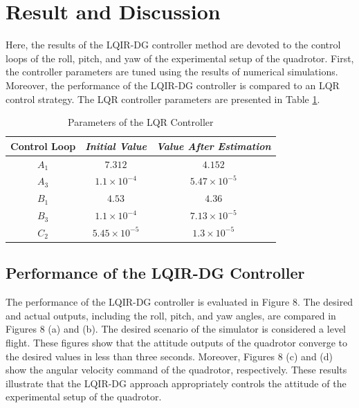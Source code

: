 \documentclass[conference]{IEEEtran}
\begin{document}
\section{Result and Discussion}
Here, the results of the LQIR-DG controller method are devoted to the control loops of the roll, pitch, and yaw of the experimental setup of the quadrotor. First, the controller parameters are tuned using the results of numerical simulations. Moreover, the performance of the LQIR-DG controller is compared to an LQR control strategy. The LQR controller parameters are presented in Table \ref{table: control gain}.
\begin{table}[!h]
	\renewcommand{\arraystretch}{1.3}
	\caption{Parameters of the LQR Controller}
	\begin{center}
	\begin{tabular}{c c c}
	\hline
	\textbf{Control Loop} & \textbf{\textit{Initial Value}}& \textbf{\textit{Value After Estimation}} \\
	\hline
	$A_1$ & $7.312$ & $4.152$ \\
	$A_3$  & $1.1\times10^{-4}$ & $5.47\times10^{-5}$\\
	$B_1$  & $4.53$ & $4.36$ \\
	$B_3$  & $1.1\times10^{-4}$ & $7.13\times10^{-5}$ \\ 
	$C_2$  & $5.45\times10^{-5}$ & $1.3\times10^{-5}$ \\
	\hline
	\end{tabular}
	\label{table: control gain}
	\end{center}
\end{table}

\subsection{Performance of the LQIR-DG Controller}

The performance of the LQIR-DG controller is evaluated in Figure 8. The desired and actual outputs, including the roll, pitch, and yaw angles, are compared in Figures 8 (a) and (b). The desired scenario of the simulator is considered a level flight. These figures show that the attitude outputs of the quadrotor converge to the desired values in less than three seconds. Moreover, Figures 8 (c) and (d) show the angular velocity command of the quadrotor, respectively. These results illustrate that the LQIR-DG approach appropriately controls the attitude of the experimental setup of the quadrotor.


\end{document}

